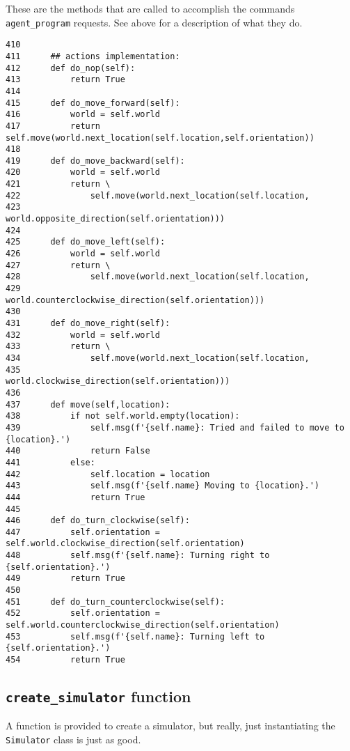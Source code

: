 \documentclass[11pt]{tufte-handout}
\begin{document}
These are the methods that are called to accomplish the commands \texttt{agent\_program} requests.  See above for a description of what they do.

\begin{verbatim}
410  
411      ## actions implementation:
412      def do_nop(self):
413          return True
414  
415      def do_move_forward(self):
416          world = self.world
417          return self.move(world.next_location(self.location,self.orientation))
418  
419      def do_move_backward(self):
420          world = self.world
421          return \
422              self.move(world.next_location(self.location,
423                                            world.opposite_direction(self.orientation)))
424  
425      def do_move_left(self):
426          world = self.world
427          return \
428              self.move(world.next_location(self.location,
429                                            world.counterclockwise_direction(self.orientation)))
430  
431      def do_move_right(self):
432          world = self.world
433          return \
434              self.move(world.next_location(self.location,
435                                            world.clockwise_direction(self.orientation)))
436  
437      def move(self,location):
438          if not self.world.empty(location):
439              self.msg(f'{self.name}: Tried and failed to move to {location}.')
440              return False
441          else:
442              self.location = location
443              self.msg(f'{self.name} Moving to {location}.')
444              return True
445  
446      def do_turn_clockwise(self):
447          self.orientation = self.world.clockwise_direction(self.orientation)
448          self.msg(f'{self.name}: Turning right to {self.orientation}.')
449          return True
450  
451      def do_turn_counterclockwise(self):
452          self.orientation = self.world.counterclockwise_direction(self.orientation)
453          self.msg(f'{self.name}: Turning left to {self.orientation}.')
454          return True
\end{verbatim}

\subsection{\texttt{create\_simulator} function}
\label{sec:org10da79d}

A function is provided to create a simulator, but really, just instantiating the \texttt{Simulator} class is just as good.
\end{document}
